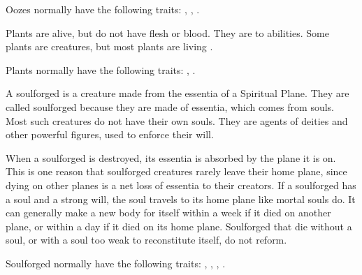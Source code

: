   Oozes normally have the following traits: , , .

  Plants are alive, but do not have flesh or blood.
  They are \vulnerable to \atFire abilities.
  Some plants are creatures, but most plants are living .

  Plants normally have the following traits: , .

  A soulforged is a creature made from the essentia of a Spiritual Plane.
  They are called soulforged because they are made of essentia, which comes from souls.
  Most such creatures do not have their own souls.
  They are agents of deities and other powerful figures, used to enforce their will.

  When a soulforged is destroyed, its essentia is absorbed by the plane it is on.
  This is one reason that soulforged creatures rarely leave their home plane, since dying on other planes is a net loss of essentia to their creators.
  If a soulforged has a soul and a strong will, the soul travels to its home plane like mortal souls do.
  It can generally make a new body for itself within a week if it died on another plane, or within a day if it died on its home plane.
  Soulforged that die without a soul, or with a soul too weak to reconstitute itself, do not reform.

  Soulforged normally have the following traits: , , , .
